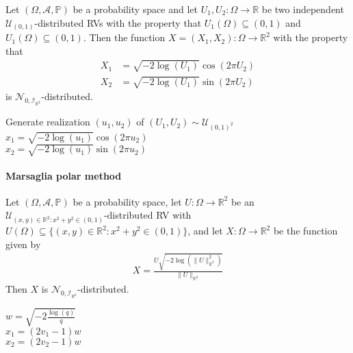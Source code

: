 \documentclass[a4paper,landscape,7pt,fleqn]{scrartcl}
\begin{document}
\begin{multicols*}{3}
Let $(\Omega, \mathcal{A}, \mathbb{P})$ be a probability space and let $U_1,U_2:\Omega \rightarrow \mathbb{R}$ be two independent $\mathcal{U}_{(0,1)}$-distributed RVs with the property that $U_1(\Omega) \subseteq (0,1)$ and $U_1(\Omega) \subseteq (0,1)$. Then the function $X = (X_1,X_2) : \Omega \rightarrow \mathbb{R}^2$ with the property that
\begin{align*}
X_1 &= \sqrt{-2 \log(U_1)} \cos(2 \pi U_2) \\
X_2 &= \sqrt{-2 \log(U_1)} \sin(2 \pi U_2)
\end{align*}
is $\mathcal{N}_{0,\mathcal{I}_{\mathbb{R}^2}}$-distributed.

\begin{algorithm}[H]
Generate realization $(u_1,u_2)$ of $(U_1,U_2) \sim \mathcal{U}_{(0,1)^2}$ \\
$x_1 = \sqrt{-2 \log(u_1)} \cos(2 \pi u_2)$ \\
$x_2 = \sqrt{-2 \log(u_1)} \sin(2 \pi u_2)$
\end{algorithm}

\paragraph{Marsaglia polar method}

Let $(\Omega, \mathcal{A}, \mathbb{P})$ be a probability space, let $U: \Omega \rightarrow \mathbb{R}^2$ be an $\mathcal{U}_{(x,y) \in \mathbb{R}^2 : x^2 + y^2 \in (0,1)}$-distributed RV with $U(\Omega) \subseteq \lbrace (x,y) \in \mathbb{R}^2 : x^2 + y^2 \in (0,1) \rbrace$, and let $X: \Omega \rightarrow \mathbb{R}^2$ be the function given by
\begin{align*}
X = \frac{U \sqrt{-2 \log \left( \| U \|^2_{\mathbb{R}^2} \right)}}{\| U \|_{\mathbb{R}^2}}
\end{align*}
Then $X$ is $\mathcal{N}_{0,\mathcal{I}_{\mathbb{R}^2}}$-distributed.

\begin{algorithm}[H]
$w = \sqrt{-2 \frac{\log(q)}{q}}$ \\
$x_1 = (2 v_1 - 1) w$ \\
$x_2 = (2 v_2 - 1) w$
\end{algorithm}


\end{multicols*}
\end{document}
